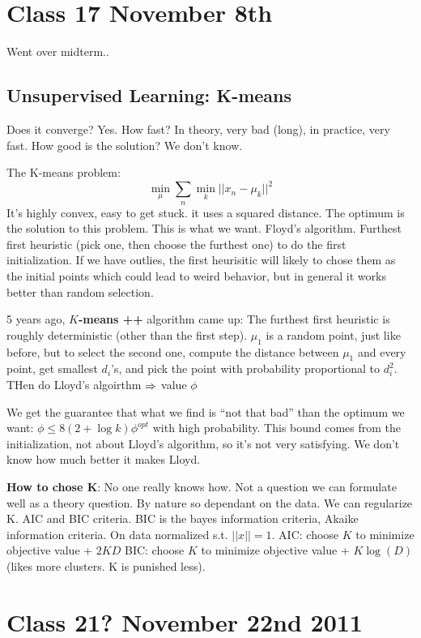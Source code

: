 \section{Class 17 November 8th}
\label{sec:class17}
Went over midterm..

\subsection{Unsupervised Learning: K-means}
Does it converge? Yes. How fast? In theory, very bad (long), in
practice, very fast. How good is the solution? We don't know.

The K-means problem: $$\min_\mu \sum_n \min_k || x_n - \mu_k ||^2$$
It's highly convex, easy to get stuck. it uses a squared distance. The optimum is the solution to this
problem. This is what we want. Floyd's algorithm.
Furthest first heuristic (pick one, then choose the furthest one) to do the
first initialization.
If we have outlies, the first heurisitic will likely to chose them as
the initial points which could lead to weird behavior, but in general
it works better than random selection.

5 years ago, \textbf{$K$-means ++ }algorithm came up: The furthest first
heuristic is roughly deterministic (other than the first
step). $\mu_1$ is a random point, just like before, but to select the
second one, compute the distance between $\mu_1$ and every point, get
smallest $d_i$'s, and pick the point with probability proportional to
$d_i^2$. THen do Lloyd's algoirthm $\Rightarrow$ value $\phi$

We get the guarantee that what we find is ``not that bad'' than the
optimum we want: $\phi \le 8(2+\log k)\phi^{opt}$ with high
probability. This bound comes from the initialization, not about
Lloyd's algorithm, so it's not very satisfying. We don't know how much
better it makes Lloyd.

\textbf{How to chose K}: No one really knows how. Not a question we
can formulate well as a theory question. By nature so dependant on the
data. We can regularize K. AIC and BIC criteria. BIC is the bayes
information criteria, Akaike information criteria.
On data normalized s.t. $||x|| = 1$.
AIC: choose $K$ to minimize objective value + $2KD$
BIC: choose $K$ to minimize objective value + $K\log(D)$ (likes more
clusters. K is punished less).




\section{Class 21? November 22nd 2011}
\label{sec:class21}

